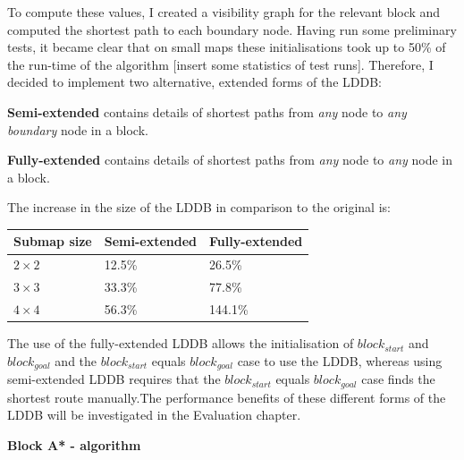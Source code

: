 \documentclass[12pt,notitlepage]{report}
\begin{document}
\noindent
To compute these values, I created a visibility graph for the relevant block and computed the shortest path to each boundary node. Having run some preliminary tests, it became clear that on small maps these initialisations took up to 50\% of the run-time of the algorithm [insert some statistics of test runs]. Therefore, I decided to implement two alternative, extended forms of the LDDB:
\begin{description}
\item{\bf Semi-extended} contains details of shortest paths from {\em any} node to {\em any boundary} node in a block.
\item{\bf Fully-extended} contains details of shortest paths from {\em any} node to {\em any} node in a block.
\end{description}

\noindent
The increase in the size of the LDDB in comparison to the original is:
\begin{center}
    \begin{tabular}{| l | l | l |}
    \hline
    Submap size & Semi-extended & Fully-extended  \\ \hline
    {$2 \times 2$}  & 12.5\% & 26.5\% \\ \hline
    {$3 \times 3$}  & 33.3\% & 77.8\%\\ \hline
    {$4 \times 4$}  & 56.3\% & 144.1\% \\ \hline
  \end{tabular}
\end{center}

\noindent
The use of the fully-extended LDDB allows the initialisation of $block_{start}$ and $block_{goal}$ and the $block_{start}$ equals $block_{goal}$ case to use the LDDB, whereas using semi-extended LDDB requires that the $block_{start}$ equals $block_{goal}$ case finds the shortest route manually.\footnotemark[1] The performance benefits of these different forms of the LDDB will be investigated in the Evaluation chapter.\\


\noindent
{\bf Block A* - algorithm} \\
\end{document}
